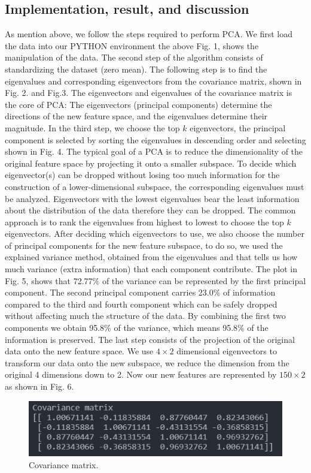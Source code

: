 \documentclass[conference]{IEEEtran}
\begin{document}
\subsection{Implementation, result, and discussion}
As mention above, we follow the steps required to perform PCA. We first load the data into our PYTHON environment the above Fig. 1, shows the manipulation of the data. 
The second step of the algorithm consists of standardizing the dataset (zero mean). The following step is to find the eigenvalues and corresponding eigenvectors from the covariance matrix, shown in Fig. 2. and Fig.3. The eigenvectors and eigenvalues of the covariance matrix is the core of PCA: The eigenvectors (principal components) determine the directions of the new feature space, and the eigenvalues determine their magnitude.
In the third step, we choose the top $k$ eigenvectors, the principal component is selected by sorting the eigenvalues in descending order and selecting shown in Fig. 4. The typical goal of a PCA is to reduce the dimensionality of the original feature space by projecting it onto a smaller subspace. To decide which eigenvector(s) can be dropped without losing too much information for the construction of a lower-dimensional subspace, the corresponding eigenvalues must be analyzed. Eigenvectors with the lowest eigenvalues bear the least information about the distribution of the data therefore they can be dropped. The common approach is to rank the eigenvalues from highest to lowest to choose the top $k$ eigenvectors. After deciding which eigenvectors to use, we also choose the number of principal components for the new feature subspace, to do so, we used the explained variance method, obtained from the eigenvalues and that tells us how much variance (extra information) that each component contribute. The plot in Fig. 5, shows that 72.77\% of the variance can be represented by the first principal component. The second principal component carries 23.0\% of information compared to the third and fourth component which can be safely dropped without affecting much the structure of the data. By combining the first two components we obtain 95.8\% of the variance, which means 95.8\% of the information is preserved. 
The last step consists of the projection of the original data onto the new feature space. We use $4\times2$ dimensional eigenvectors to transform our data onto the new subspace, we reduce the dimension from the original 4 dimensions down to 2. Now our new features are represented by $150\times2$ as shown in Fig. 6.
\begin{figure}[h]
\centerline{\includegraphics[scale=0.7]{Figures/Covariance Matrix.png}}
\caption{Covariance matrix.}
\label{fig}
\end{figure}
\end{document}
